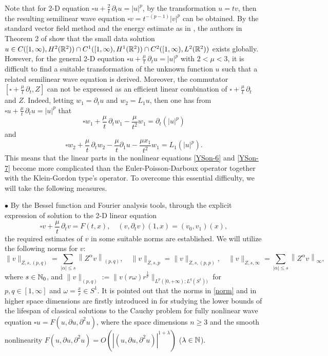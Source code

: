 \documentclass[11pt,twoside]{article}
\newcommand{\p}{\partial}
\newcommand{\f}{\frac}
\renewcommand{\o}{\omega}
\theoremstyle{plain}
\theoremstyle{definition}
\theoremstyle{remark}
\numberwithin{equation}{section}
\begin{document}
Note that for 2-D equation $\square u +\f{2}{t}\,\p_tu=|u|^p$, by the transformation $u=tv$,
then the resulting semilinear wave equation $\square v=t^{-(p-1)}|v|^p$ can be obtained. By the standard vector field method
and the energy estimate as in \cite{LX}, the authors in Theorem 2 of \cite{Rei1} show that the small data solution
$u\in C([1,\infty), H^2(\Bbb R^2))\cap C^1([1,\infty), H^1(\Bbb R^2))\cap C^2([1,\infty), L^2(\Bbb R^2))$ exists globally.
However, for the general 2-D equation $\square u +\f{\mu}{t}\,\p_tu=|u|^p$ with $2<\mu<3$, it is difficult to find
a suitable transformation of the unknown function $u$ such that a related semilinear wave equation is derived.
Moreover, the commutator $[\square+\f{\mu}{t}\,\p_t, Z]$ can not be expressed as an efficient linear combination of
$\square+\f{\mu}{t}\,\p_t$ and $Z$. Indeed, letting $w_1=\p_t u$ and $w_2=L_1 u$, then one has from $\square u +\f{\mu}{t}\,\p_tu=|u|^p$
that
\begin{equation}\label{YSon-6}
\square w_1 +\f{\mu}{t}\,\p_tw_1- \f{\mu}{t^2}w_1=\p_t(|u|^p)
\end{equation}
and
\begin{equation}\label{YSon-7}
\square w_2 +\f{\mu}{t}\,\p_tw_2-\f{\mu}{t}\p_1u- \f{\mu x_1}{t^2}w_1=L_1(|u|^p).
\end{equation}
This means that the linear parts in the nonlinear equations \eqref{YSon-6} and \eqref{YSon-7}
become more complicated than the Euler-Poisson-Darboux operator together with the Klein-Gordon type's operator.
To overcome this essential difficulty, we will take the following measures.

$\bullet$ By the Bessel function and Fourier analysis tools, through the explicit expression of
solution to the 2-D linear equation
\begin{equation}\label{YSon-2}
\square v+\f{\mu}{t}\,\p_tv=F(t,x),\quad (v,\p_tv)(1,x)=(v_0,v_1)(x),
\end{equation}
the required estimates of $v$ in some suitable norms are established.
We will utilize the following norms for $v$:
\begin{equation}\label{norm}
\|v\|_{Z, s,(p, q)}=\sum_{|\alpha| \leq s}\left\|Z^\alpha v\right\|_{(p, q)}, \quad
\|v\|_{Z, s, p}=\|v\|_{Z, s,(p, p)}, \quad
\|v\|_{Z, s, \infty}=\sum_{|\alpha| \leq s}\left\|Z^\alpha v\right\|_{\infty},
\end{equation}
where $s\in\Bbb N_0$, and $\|v\|_{(p,q)} :=\|v(r \omega) r^{\frac{1}{p}}\|_{L^p([0,+\infty); L^q(S^1))}$
for $p,q\in[1,\infty]$ and $\o=\f{x}{r}\in S^1$.
It is pointed out that the norms in \eqref{norm} and in higher space dimensions are firstly introduced in \cite{LX}
for studying the lower bounds
of the lifespan of classical solutions to the Cauchy problem for fully nonlinear wave equation
$\square u=F(u,\p u, \p^2 u)$, where the space dimensions $n\ge 3$ and the smooth nonlinearity
$F(u,\p u, \p^2 u)=O(|(u, \p u, \p^2 u)|^{1+\lambda})$ ($\lambda\in\Bbb N$).
\end{document}
